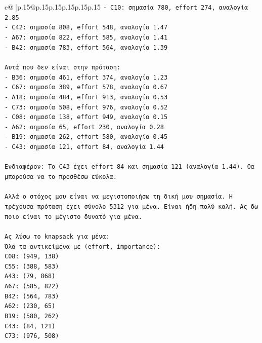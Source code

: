 \documentclass{article}
\begin{document}
{\begin{supertabular}{c@{$\;$}|p{.15\linewidth}@{}p{.15\linewidth}p{.15\linewidth}p{.15\linewidth}p{.15\linewidth}p{.15\linewidth}}
{{{\texttt{{-} C10: σημασία 780, effort 274, αναλογία 2.85} \\
\texttt{{-} C42: σημασία 808, effort 548, αναλογία 1.47} \\
\texttt{{-} A67: σημασία 822, effort 585, αναλογία 1.41} \\
\texttt{{-} B42: σημασία 783, effort 564, αναλογία 1.39} \\
\\ 
\texttt{Αυτά που δεν είναι στην πρόταση:} \\
\texttt{{-} B36: σημασία 461, effort 374, αναλογία 1.23} \\
\texttt{{-} C67: σημασία 389, effort 578, αναλογία 0.67} \\
\texttt{{-} A18: σημασία 484, effort 913, αναλογία 0.53} \\
\texttt{{-} C73: σημασία 508, effort 976, αναλογία 0.52} \\
\texttt{{-} C08: σημασία 138, effort 949, αναλογία 0.15} \\
\texttt{{-} A62: σημασία 65, effort 230, αναλογία 0.28} \\
\texttt{{-} B19: σημασία 262, effort 580, αναλογία 0.45} \\
\texttt{{-} C43: σημασία 121, effort 84, αναλογία 1.44} \\
\\ 
\texttt{Ενδιαφέρον: Το C43 έχει effort 84 και σημασία 121 (αναλογία 1.44). Θα μπορούσα να το προσθέσω εύκολα.} \\
\\ 
\texttt{Αλλά ο στόχος μου είναι να μεγιστοποιήσω τη δική μου σημασία. Η τρέχουσα πρόταση έχει σύνολο 5312 για μένα. Είναι ήδη πολύ καλή. Ας δω ποιο είναι το μέγιστο δυνατό για μένα.} \\
\\ 
\texttt{Ας λύσω το knapsack για μένα:} \\
\texttt{Όλα τα αντικείμενα με (effort, importance):} \\
\texttt{C08: (949, 138)} \\
\texttt{C55: (388, 583)} \\
\texttt{A43: (79, 868)} \\
\texttt{A67: (585, 822)} \\
\texttt{B42: (564, 783)} \\
\texttt{A62: (230, 65)} \\
\texttt{B19: (580, 262)} \\
\texttt{C43: (84, 121)} \\
\texttt{C73: (976, 508)} \\
}}}
\end{supertabular}}
\end{document}
